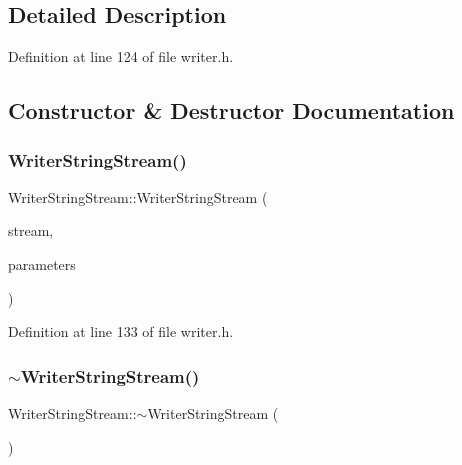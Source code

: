 \subsection{Detailed Description}


Definition at line 124 of file writer.\+h.



\subsection{Constructor \& Destructor Documentation}
\mbox{\label{classWriterStringStream_a96a17e1928eb2f037225eec2f21a1c1b}} 
\subsubsection{\texorpdfstring{Writer\+String\+Stream()}{WriterStringStream()}}
{\footnotesize\ttfamily Writer\+String\+Stream\+::\+Writer\+String\+Stream (\begin{DoxyParamCaption}\item[{std\+::stringstream \&}]{stream,  }\item[{const \hyperlink{structProgramParameters}{Program\+Parameters} \&}]{parameters }\end{DoxyParamCaption})\hspace{0.3cm}{\ttfamily [inline]}}



Definition at line 133 of file writer.\+h.

\mbox{\label{classWriterStringStream_a0b789879c2adc30ad28012bc47b7f82f}} 
\subsubsection{\texorpdfstring{$\sim$\+Writer\+String\+Stream()}{~WriterStringStream()}}
{\footnotesize\ttfamily Writer\+String\+Stream\+::$\sim$\+Writer\+String\+Stream (\begin{DoxyParamCaption}{ }\end{DoxyParamCaption})\hspace{0.3cm}{\ttfamily [inline]}}



